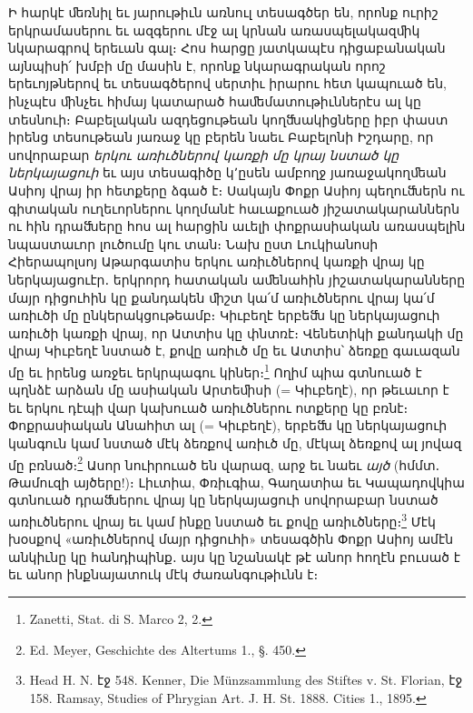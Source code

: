 \documentclass{article}
\begin{document}
{Ի հարկէ ﬔռնիլ եւ յարութիւն առնուլ տեսագծեր են, որոնք ուրիշ երկրամասերու եւ ազգերու մէջ ալ կրնան առասպելակազﬕկ նկարագրով երեւան գալ։ Հոս հարցը յատկապէս դիցաբանական այնպիսի՛ խմբի մը մասին է, որոնք նկարագրական որոշ երեւոյթներով եւ տեսագծերով սերտիւ իրարու հետ կապուած են, ինչպէս ﬕնչեւ հիմայ կատարած հաﬔմատութիւններէս ալ կը տեսնուի։ Բաբելական ազդեցութեան կողﬓակիցները իբր փաստ իրենց տեսութեան յառաջ կը բերեն նաեւ Բաբելոնի Իշդարը, որ սովորաբար \emph{երկու առիւծներով կառքի մը կրայ նստած կը ներկայացուի} եւ այս տեսագիծը կ՚ըսեն ամբողջ յառաջակողﬔան Ասիոյ վրայ իր հետքերը ձգած է։ Սակայն Փոքր Ասիոյ պեղուﬓերն ու գիտական ուղեւորներու կողմանէ հաւաքուած յիշատակարաններն ու հին դրաﬓերը հոս ալ հարցին աւելի փոքրասիական առասպելին նպաստաւոր լուծումը կու տան։ Նախ ըստ Լուկիանոսի Հիերապոլսոյ Աթարգատիս երկու առիւծներով կառքի վրայ կը ներկայացուէր․ երկրորդ հատական աﬔնահին յիշատակարանները մայր դիցուհին կը քանդակեն ﬕշտ կա՛մ առիւծներու վրայ կա՛մ առիւծի մը ընկերակցութեամբ։ Կիւբեղէ երբեﬓ կը ներկայացուի առիւծի կառքի վրայ, որ Ատտիս կը փնտռէ։ Վենետիկի քանդակի մը վրայ Կիւբեղէ նստած է, քովը առիւծ մը եւ Ատտիս՝ ձեռքը գաւազան մը եւ իրենց առջեւ երկրպագու կիներ։\footnote{Zanetti, Stat. di S. Marco 2, 2.} Ողիմ պիա գտնուած է պղնձէ արձան մը ասիական Արտեﬕսի (= Կիւբեղէ), որ թեւաւոր է եւ երկու դէպի վար կախուած առիւծներու ոտքերը կը բռնէ։ Փոքրասիական Անահիտ ալ (= Կիւբեղէ), երբեﬓ կը ներկայացուի կանգուն կամ նստած մէկ ձեռքով առիւծ մը, մէկալ ձեռքով ալ յովազ մը բռնած։\footnote{Ed. Meyer, Geschichte des Altertums 1., §. 450.} Ասոր նուիրուած են վարազ, արջ եւ նաեւ \emph{այծ} (հմմտ․ Թամուզի այծերը!)։ Լիւտիա, Փռիւգիա, Գաղատիա եւ Կապադովկիա գտնուած դրաﬓերու վրայ կը ներկայացուի սովորաբար նստած առիւծներու վրայ եւ կամ ինքը նստած եւ քովը առիւծները։\footnote{Head H. N. էջ 548. Kenner, Die Münzsammlung des Stiftes v. St. Florian, էջ 158. Ramsay, Studies of Phrygian Art. J. H. St. 1888. Cities 1., 1895.} Մէկ խօսքով «առիւծներով մայր դիցուհի» տեսագծին Փոքր Ասիոյ ամէն անկիւնը կը հանդիպինք․ այս կը նշանակէ թէ անոր հողէն բուսած է եւ անոր ինքնայատուկ մէկ ժառանգութիւնն է։

}
\end{document}
